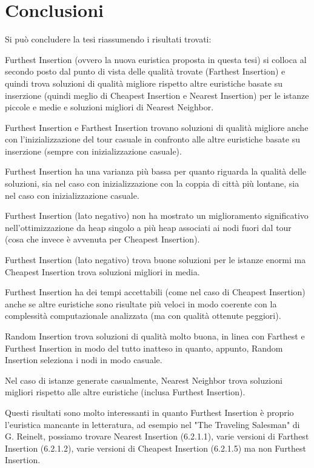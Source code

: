 \documentclass[a4paper,12pt]{report}
\begin{document}
\chapter{Conclusioni}
Si può concludere la tesi riassumendo i risultati trovati:
\begin{legal}
  \item Furthest Insertion (ovvero la nuova euristica proposta in questa tesi) si colloca al secondo posto dal punto di vista delle qualità trovate (Farthest Insertion) e quindi trova soluzioni di qualità migliore rispetto altre euristiche basate su inserzione (quindi meglio di Cheapest Insertion e Nearest Insertion) per le istanze piccole e medie e soluzioni migliori di Nearest Neighbor.
  \item Furthest Insertion e Farthest Insertion trovano soluzioni di qualità migliore anche con l'inizializzazione del tour casuale in confronto alle altre euristiche basate su inserzione (sempre con inizializzazione casuale).
  \item Furthest Insertion ha una varianza più bassa per quanto riguarda la qualità delle soluzioni, sia nel caso con inizializzazione con la coppia di città più lontane, sia nel caso con inizializzazione casuale.
  \item Furthest Insertion (lato negativo) non ha mostrato un miglioramento significativo nell'ottimizzazione da heap singolo a più heap associati ai nodi fuori dal tour (cosa che invece è avvenuta per Cheapest Insertion).
  \item Furthest Insertion (lato negativo) trova buone soluzioni per le istanze enormi ma Cheapest Insertion trova soluzioni migliori in media.
  \item Furthest Insertion ha dei tempi accettabili (come nel caso di Cheapest Insertion) anche se altre euristiche sono risultate più veloci in modo coerente con la complessità computazionale analizzata (ma con qualità ottenute peggiori).
  \item Random Insertion trova soluzioni di qualità molto buona, in linea con Farthest e Furthest Insertion in modo del tutto inatteso in quanto, appunto, Random Insertion seleziona i nodi in modo casuale.
  \item Nel caso di istanze generate casualmente, Nearest Neighbor trova soluzioni migliori rispetto alle altre euristiche (inclusa Furthest Insertion).
\end{legal}
Questi risultati sono molto interessanti in quanto Furthest Insertion è proprio l'euristica mancante in letteratura, ad esempio nel "The Traveling Salesman" di G. Reinelt\cite{Reinelt}, possiamo trovare Nearest Insertion (6.2.1.1), varie versioni di Farthest Insertion (6.2.1.2), varie versioni di Cheapest Insertion (6.2.1.5) ma non Furthest Insertion.
\end{document}
